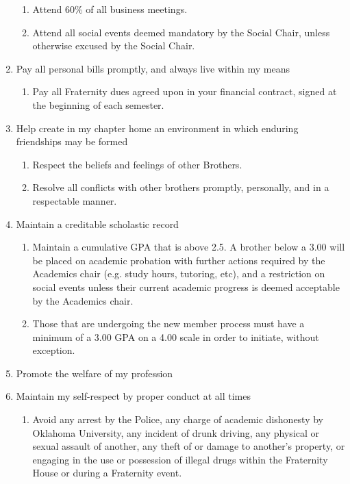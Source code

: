 \documentclass{article}
\begin{document}
\begin{enumerate}
\begin{enumerate}
        \item Attend 60\% of all business meetings.
        \item Attend all social events deemed mandatory by the Social Chair, unless otherwise excused by the Social Chair.
    \end{enumerate}
    \item Pay all personal bills promptly, and always live within my means
    \begin{enumerate}
        \item Pay all Fraternity dues agreed upon in your financial contract, signed at the beginning of each semester.
    \end{enumerate}
    \item Help create in my chapter home an environment in which enduring friendships may be formed
    \begin{enumerate}
        \item Respect the beliefs and feelings of other Brothers.
        \item Resolve all conflicts with other brothers promptly, personally, and in a respectable manner.
    \end{enumerate}
    \item Maintain a creditable scholastic record
    \begin{enumerate}
        \item Maintain a cumulative GPA that is above 2.5. A brother below a 3.00 will be placed on academic probation with further actions required by the Academics chair (e.g. study hours, tutoring, etc), and a restriction on social events unless their current academic progress is deemed acceptable by the Academics chair.
        \item Those that are undergoing the new member process must have a minimum of a 3.00 GPA on a 4.00 scale in order to initiate, without exception.
    \end{enumerate}
    \item Promote the welfare of my profession
    \item Maintain my self-respect by proper conduct at all times
    \begin{enumerate}
        \item Avoid any arrest by the Police, any charge of academic dishonesty by Oklahoma University, any incident of drunk driving, any physical or sexual assault of another, any theft of or damage to another’s property, or engaging in the use or possession of illegal drugs within the Fraternity House or during a Fraternity event.

\end{enumerate}
\end{enumerate}
\end{document}
